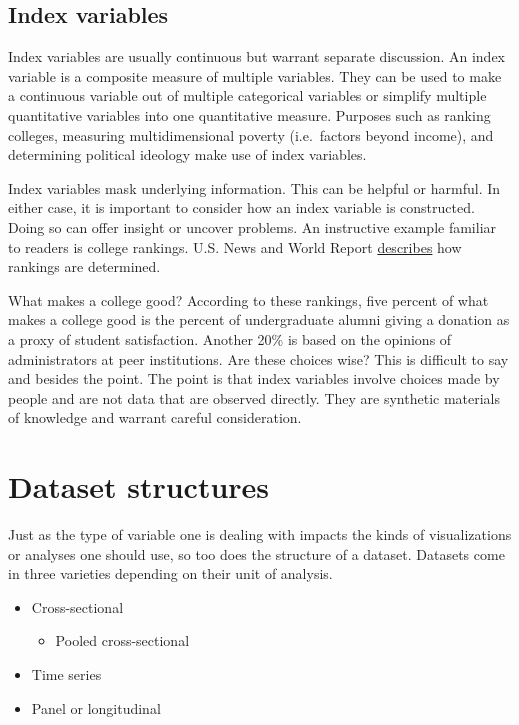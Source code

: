 \documentclass[
]{book}
\providecommand{\tightlist}{%
  \setlength{\itemsep}{0pt}\setlength{\parskip}{0pt}}
\begin{document}
\hypertarget{index-variables}{%
\subsection{Index variables}\label{index-variables}}

Index variables are usually continuous but warrant separate discussion. An index variable is a composite measure of multiple variables. They can be used to make a continuous variable out of multiple categorical variables or simplify multiple quantitative variables into one quantitative measure. Purposes such as ranking colleges, measuring multidimensional poverty (i.e.~factors beyond income), and determining political ideology make use of index variables.

Index variables mask underlying information. This can be helpful or harmful. In either case, it is important to consider how an index variable is constructed. Doing so can offer insight or uncover problems. An instructive example familiar to readers is college rankings. U.S. News and World Report \href{https://www.usnews.com/education/best-colleges/articles/ranking-criteria-and-weights}{describes} how rankings are determined.

What makes a college good? According to these rankings, five percent of what makes a college good is the percent of undergraduate alumni giving a donation as a proxy of student satisfaction. Another 20\% is based on the opinions of administrators at peer institutions. Are these choices wise? This is difficult to say and besides the point. The point is that index variables involve choices made by people and are not data that are observed directly. They are synthetic materials of knowledge and warrant careful consideration.

\hypertarget{dataset-structures}{%
\section{Dataset structures}\label{dataset-structures}}

Just as the type of variable one is dealing with impacts the kinds of visualizations or analyses one should use, so too does the structure of a dataset. Datasets come in three varieties depending on their unit of analysis.

\begin{itemize}
\tightlist
\item
  Cross-sectional

  \begin{itemize}
  \tightlist
  \item
    Pooled cross-sectional
  \end{itemize}
\item
  Time series
\item
  Panel or longitudinal
\end{itemize}
\end{document}
